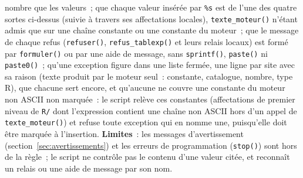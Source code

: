 \documentclass[a4paper,11pt]{article}
\newcommand{\code}[1]{\texttt{\small #1}}
\begin{document}
nombre que les valeurs~; que chaque valeur insérée par \code{\%s} est de
l'une des quatre sortes ci-dessus (suivie à travers ses affectations
locales), \code{texte\_moteur()} n'étant admis que sur une chaîne
constante ou une constante du moteur~; que le message de chaque refus (\code{refuser()},
\code{refus\_tablexp()} et leurs relais locaux) est formé par
\code{formuler()} ou par une aide de message, sans \code{sprintf()},
\code{paste()} ni \code{paste0()}~; qu'une exception figure dans une liste
fermée, une ligne par site avec sa raison (texte produit par le moteur
seul~: constante, catalogue, nombre, type R), que chacune sert encore, et
qu'aucune ne couvre une constante du moteur non ASCII non marquée~: le
script relève ces constantes (affectations de premier niveau de
\code{R/} dont l'expression contient une chaîne non ASCII hors d'un appel
de \code{texte\_moteur()}) et refuse toute exception qui en nomme une,
puisqu'elle doit être marquée à l'insertion.
\textbf{Limites}~: les messages d'avertissement
(section~\ref{sec:avertissements}) et les erreurs de programmation
(\code{stop()}) sont hors de la règle~; le script ne contrôle pas le
contenu d'une valeur citée, et reconnaît un relais ou une aide de message
par son nom.
\end{document}
